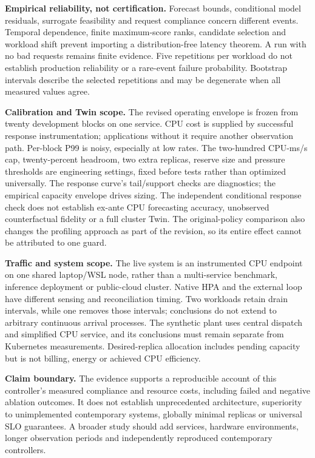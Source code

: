 \documentclass[10pt,twocolumn,a4paper]{article}
\begin{document}
\textbf{Empirical reliability, not certification.} Forecast bounds, conditional model residuals, surrogate feasibility and request compliance concern different events. Temporal dependence, finite maximum-score ranks, candidate selection and workload shift prevent importing a distribution-free latency theorem. A run with no bad requests remains finite evidence. Five repetitions per workload do not establish production reliability or a rare-event failure probability. Bootstrap intervals describe the selected repetitions and may be degenerate when all measured values agree.

\textbf{Calibration and Twin scope.} The revised operating envelope is frozen from twenty development blocks on one service. CPU cost is supplied by successful response instrumentation; applications without it require another observation path. Per-block P99 is noisy, especially at low rates. The two-hundred CPU-ms/s cap, twenty-percent headroom, two extra replicas, reserve size and pressure thresholds are engineering settings, fixed before tests rather than optimized universally. The response curve's tail/support checks are diagnostics; the empirical capacity envelope drives sizing. The independent conditional response check does not establish ex-ante CPU forecasting accuracy, unobserved counterfactual fidelity or a full cluster Twin. The original-policy comparison also changes the profiling approach as part of the revision, so its entire effect cannot be attributed to one guard.

\textbf{Traffic and system scope.} The live system is an instrumented CPU endpoint on one shared laptop/WSL node, rather than a multi-service benchmark, inference deployment or public-cloud cluster. Native HPA and the external loop have different sensing and reconciliation timing. Two workloads retain drain intervals, while one removes those intervals; conclusions do not extend to arbitrary continuous arrival processes. The synthetic plant uses central dispatch and simplified CPU service, and its conclusions must remain separate from Kubernetes measurements. Desired-replica allocation includes pending capacity but is not billing, energy or achieved CPU efficiency.

\textbf{Claim boundary.} The evidence supports a reproducible account of this controller's measured compliance and resource costs, including failed and negative ablation outcomes. It does not establish unprecedented architecture, superiority to unimplemented contemporary systems, globally minimal replicas or universal SLO guarantees. A broader study should add services, hardware environments, longer observation periods and independently reproduced contemporary controllers.
\end{document}
